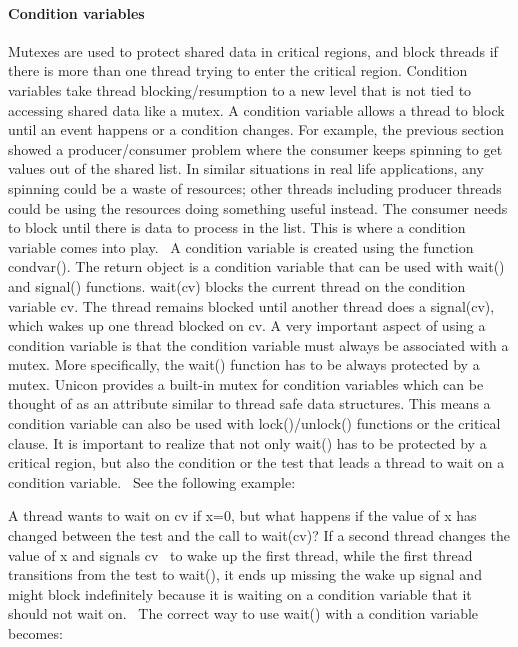 \paragraph[Condition variables]{Condition variables}
Mutexes are used to protect shared data in critical regions, and block
threads if there is more than one thread trying to enter the critical
region. Condition variables take thread blocking/resumption to a new
level that is not tied to accessing shared data like a mutex. A
condition variable allows a thread to block until an event happens or a
condition changes. For example, the previous section showed a
producer/consumer problem where the consumer keeps spinning to get
values out of the shared list. In similar situations in real life
applications, any spinning could be a waste of resources; other threads
including producer threads could be using the resources doing something
useful instead. The consumer needs to block until there is data to
process in the list. This is where a condition variable comes into
play. \ A condition variable is created using the function
\textsf{condvar()}. The return object is a condition
variable that can be used with \textsf{wait()} and
\textsf{signal()} functions. \textsf{wait(cv)}
blocks the current thread on the condition variable
\textsf{cv}. The thread remains blocked until another
thread does a \textsf{signal(cv)}, which wakes up one thread
blocked on \textsf{cv}. A very important aspect of
using a condition variable is that the condition variable must always
be associated with a mutex. More specifically, the
\textsf{wait()} function has to be always protected by a
mutex. Unicon provides a built-in mutex for condition variables which
can be thought of as an attribute similar to thread safe data
structures. This means a condition variable can also be used with
\textsf{lock()}/\textsf{unlock()} functions or
the critical clause. It is important to realize that not only
\textsf{wait()} has to be protected by a critical region,
but also the condition or the test that leads a thread to wait on a
condition variable. \ See the following example:


A thread wants to wait on \textsf{cv} if
\textsf{x=0}, but what happens if the value of
\textsf{x} has changed between the test and the call to
\textsf{wait(cv)}? If a second thread changes the value of
\textsf{x} and signals \textsf{cv} \ to wake up
the first thread, while the first thread transitions from the test to
\textsf{wait()}\textsf{,} it ends up missing the
wake up signal and might block indefinitely because it is waiting on a
condition variable that it should not wait on. \ The correct way to use
\textsf{wait()} with a condition variable becomes:

